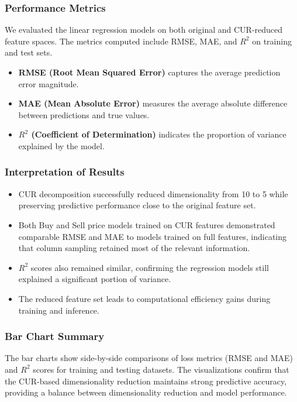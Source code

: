 \subsubsection{Performance Metrics}\text{}

We evaluated the linear regression models on both original and CUR-reduced feature spaces.
The metrics computed include RMSE, MAE, and $R^2$ on training and test sets.
\begin{itemize}
    \item \textbf{RMSE (Root Mean Squared Error)} captures the average prediction error magnitude.
    \item \textbf{MAE (Mean Absolute Error)} measures the average absolute difference between predictions and true values.
    \item \textbf{$R^2$ (Coefficient of Determination)} indicates the proportion of variance explained by the model.
\end{itemize}

\subsubsection{Interpretation of Results}\text{}

\begin{itemize}
    \item CUR decomposition successfully reduced dimensionality from 10 to 5 while preserving predictive performance close to the original feature set.
    \item Both Buy and Sell price models trained on CUR features demonstrated comparable RMSE and MAE to models trained on full features, indicating that column sampling retained most of the relevant information.
    \item $R^2$ scores also remained similar, confirming the regression models still explained a significant portion of variance.
    \item The reduced feature set leads to computational efficiency gains during training and inference.
\end{itemize}

\subsubsection{Bar Chart Summary}\text{}

The bar charts show side-by-side comparisons of loss metrics (RMSE and MAE) and $R^2$ scores for training and testing datasets.
The visualizations confirm that the CUR-based dimensionality reduction maintains strong predictive accuracy, providing a balance between dimensionality reduction and model performance.

